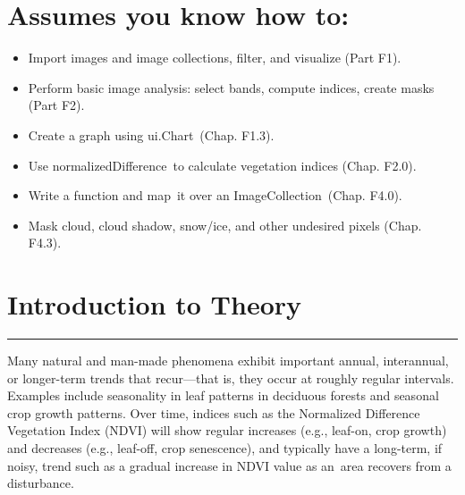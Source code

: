 \documentclass[
  letterpaper,
  DIV=11,
  numbers=noendperiod]{scrreprt}
\providecommand{\tightlist}{%
  \setlength{\itemsep}{0pt}\setlength{\parskip}{0pt}}\usepackage{longtable,booktabs,array}
\begin{document}
\hypertarget{assumes-you-know-how-to-13}{%
\section*{Assumes you know how to:}\label{assumes-you-know-how-to-13}}


\begin{itemize}
\tightlist
\item
  Import images and image collections, filter, and visualize (Part F1).
\item
  Perform basic image analysis: select bands, compute indices, create
  masks (Part F2).
\item
  \hspace{0pt}\hspace{0pt}Create a graph using ui.Chart~(Chap. F1.3).
\item
  Use normalizedDifference~to calculate vegetation indices (Chap. F2.0).
\item
  Write a function and map~it over an ImageCollection~(Chap. F4.0).
\item
  Mask cloud, cloud shadow, snow/ice, and other undesired pixels (Chap.
  F4.3).
\end{itemize}

\hypertarget{introduction-to-theory-8}{%
\section*{Introduction to Theory}\label{introduction-to-theory-8}}


\begin{center}\rule{0.5\linewidth}{0.5pt}\end{center}

Many natural and man-made phenomena exhibit important annual,
interannual, or longer-term trends that recur---that is, they occur at
roughly regular intervals. Examples include seasonality in leaf patterns
in deciduous forests and seasonal crop growth patterns. Over time,
indices such as the Normalized Difference Vegetation Index (NDVI) will
show regular increases (e.g., leaf-on, crop growth) and decreases (e.g.,
leaf-off, crop senescence), and typically have a long-term, if noisy,
trend such as a gradual increase in NDVI value as an~area recovers from
a disturbance.
\end{document}
